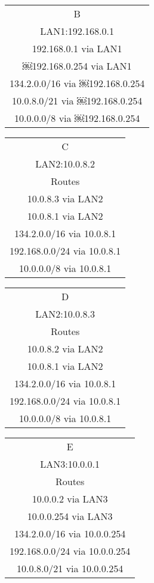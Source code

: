 \documentclass[paper=a4, fontsize=11pt]{scrartcl}
\numberwithin{equation}{section}
\numberwithin{figure}{section}
\numberwithin{table}{section}
\begin{document}
\begin{tabular}{|c|}
\hline
B\\
LAN1:192.168.0.1\\
192.168.0.1 via LAN1\\
￼192.168.0.254 via LAN1\\
134.2.0.0/16 via ￼192.168.0.254\\
10.0.8.0/21 via ￼192.168.0.254\\
10.0.0.0/8 via ￼192.168.0.254
\\\hline
\end{tabular}\newline\newline

\begin{tabular}{|c|}
\hline
C\\
LAN2:10.0.8.2\\
Routes\\
10.0.8.3 via LAN2\\
10.0.8.1 via LAN2\\
134.2.0.0/16 via 10.0.8.1\\
192.168.0.0/24 via 10.0.8.1\\
10.0.0.0/8 via 10.0.8.1
\\\hline
\end{tabular}\newline\newline

\begin{tabular}{|c|}
\hline
D\\
LAN2:10.0.8.3\\
Routes\\
10.0.8.2 via LAN2\\
10.0.8.1 via LAN2\\
134.2.0.0/16 via 10.0.8.1\\
192.168.0.0/24 via 10.0.8.1\\
10.0.0.0/8 via 10.0.8.1
\\\hline
\end{tabular}\newline\newline

\begin{tabular}{|c|}
\hline
E\\
LAN3:10.0.0.1\\
Routes\\
10.0.0.2 via LAN3\\
10.0.0.254 via LAN3\\
134.2.0.0/16 via 10.0.0.254\\
192.168.0.0/24 via 10.0.0.254\\
10.0.8.0/21 via 10.0.0.254
\\\hline
\end{tabular}\newline\newline
\end{document}
